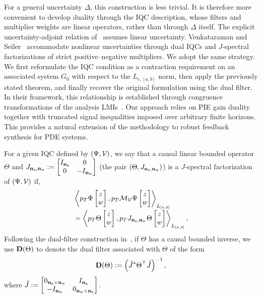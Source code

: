 For a general uncertainty $\Delta$, this construction is
less trivial. It is therefore more convenient to develop duality
through the IQC description, whose filters and multiplier weights are
linear operators, rather than through $\Delta$ itself.
The explicit uncertainty-adjoint relation of~\cite{kose2009robust} assumes linear uncertainty.
Venkataraman and Seiler~\cite{venkataraman} accommodate nonlinear
uncertainties through dual IQCs and $J$-spectral factorizations of strict
positive--negative multipliers. We adopt the same strategy.
We first reformulate the IQC condition as a contraction requirement 
on an associated system \(G_0\) with respect to the 
\(L_{e,[a,b]}\) norm, then apply the previously stated theorem,
and finally recover the original formulation using the dual filter. 
In their framework, this relationship is established through congruence 
transformations of the analysis LMIs~\cite[Sec.~3]{venkataraman}. Our approach relies 
on PIE gain duality together with truncated signal inequalities imposed over arbitrary finite horizons. 
This provides a natural extension of the methodology to robust feedback synthesis for PDE systems.
\begin{definition} 
\label{def:dynamic-filters}\label{def:factorization}
For a given IQC defined by $(\Psi,{\mathcal{V}})$, we say that  a causal linear bounded operator $\Theta$ and $J_{\mathbf{n}_{{\mathrm{z}}},\mathbf{n}_{{\mathrm{w}}}}:=\begin{bmatrix} I_{\mathbf{n}_{{\mathrm{z}}}} & 0 \\ 0& -I_{\mathbf{n}_{{\mathrm{w}}}} \end{bmatrix}$
(the pair $(\Theta,J_{\mathbf{n}_{{\mathrm{z}}},\mathbf{n}_{{\mathrm{w}}}})$) is a $J$-spectral factorization of $(\Psi,{\mathcal{V}})$ if, 
\begin{equation*}
\begin{aligned}
&
\left\langle p_T\Psi\begin{bmatrix}z\\w\end{bmatrix}, p_T\mathcal{M}_{\mathcal{V}}\Psi\begin{bmatrix}z\\w\end{bmatrix} \right\rangle_{L_{[a,b]}}
\\[-1mm] &=
\left\langle p_T\Theta\begin{bmatrix}z\\w\end{bmatrix}, p_TJ_{\mathbf{n}_{{\mathrm{z}}},\mathbf{n}_{{\mathrm{w}}}}\Theta\begin{bmatrix}z\\w\end{bmatrix} \right\rangle_{L_{[a,b]}},
\end{aligned}
\end{equation*}
Following the dual-filter construction in~\cite{venkataraman}, if $\Theta$
has a causal bounded inverse, we use $\mathbf{D}(\Theta)$ to denote the dual filter
associated with $\Theta$ of the form
\begin{equation*}
\mathbf{D}(\Theta)
:=
\left(\hat{J}^*\Theta^\top\hat{J}\right)^{-1},
\end{equation*}
where $\hat{J}:=\begin{bmatrix}0_{\mathbf{n}_{{\mathrm{z}}}\times\mathbf{n}_{{\mathrm{w}}}}&I_{\mathbf{n}_{{\mathrm{z}}}}\\-I_{\mathbf{n}_{{\mathrm{w}}}}&0_{\mathbf{n}_{{\mathrm{w}}}\times\mathbf{n}_{{\mathrm{z}}}}\end{bmatrix}$.
\end{definition}
